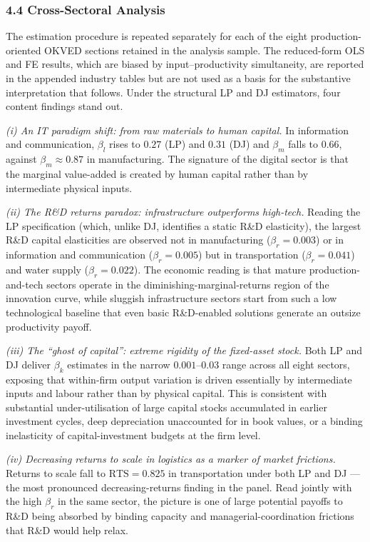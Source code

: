 \documentclass[a4paper, 12pt]{article}
\begin{document}
\subsubsection{4.4 Cross-Sectoral Analysis}

The estimation procedure is repeated separately for each of the eight production-oriented OKVED sections retained in the analysis sample. The reduced-form OLS and FE results, which are biased by input--productivity simultaneity, are reported in the appended industry tables but are not used as a basis for the substantive interpretation that follows. Under the structural LP and DJ estimators, four content findings stand out.

\emph{(i) An IT paradigm shift: from raw materials to human capital.} In information and communication, $\beta_l$ rises to $0.27$ (LP) and $0.31$ (DJ) and $\beta_m$ falls to $0.66$, against $\beta_m \approx 0.87$ in manufacturing. The signature of the digital sector is that the marginal value-added is created by human capital rather than by intermediate physical inputs.

\emph{(ii) The R\&D returns paradox: infrastructure outperforms high-tech.} Reading the LP specification (which, unlike DJ, identifies a static R\&D elasticity), the largest R\&D capital elasticities are observed not in manufacturing ($\beta_r = 0.003$) or in information and communication ($\beta_r = 0.005$) but in transportation ($\beta_r = 0.041$) and water supply ($\beta_r = 0.022$). The economic reading is that mature production-and-tech sectors operate in the diminishing-marginal-returns region of the innovation curve, while sluggish infrastructure sectors start from such a low technological baseline that even basic R\&D-enabled solutions generate an outsize productivity payoff.

\emph{(iii) The ``ghost of capital'': extreme rigidity of the fixed-asset stock.} Both LP and DJ deliver $\beta_k$ estimates in the narrow $0.001$--$0.03$ range across all eight sectors, exposing that within-firm output variation is driven essentially by intermediate inputs and labour rather than by physical capital. This is consistent with substantial under-utilisation of large capital stocks accumulated in earlier investment cycles, deep depreciation unaccounted for in book values, or a binding inelasticity of capital-investment budgets at the firm level.

\emph{(iv) Decreasing returns to scale in logistics as a marker of market frictions.} Returns to scale fall to $\text{RTS} = 0.825$ in transportation under both LP and DJ --- the most pronounced decreasing-returns finding in the panel. Read jointly with the high $\beta_r$ in the same sector, the picture is one of large potential payoffs to R\&D being absorbed by binding capacity and managerial-coordination frictions that R\&D would help relax.
\end{document}
